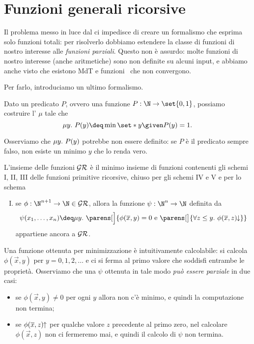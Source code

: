 \section{Funzioni generali ricorsive}

Il problema messo in luce dal  ci impedisce di creare un formalismo che esprima solo funzioni totali: per risolverlo dobbiamo estendere la classe di funzioni di nostro interesse alle \emph{funzioni parziali}. 
Questo non è assurdo: molte funzioni di nostro interesse (anche aritmetiche) sono non definite su alcuni input, e abbiamo anche visto che esistono MdT e funzioni \WHILE\ che non convergono.

Per farlo, introduciamo un ultimo formalismo.

\begin{definition}
    Dato un predicato $P$, ovvero una funzione $P : \N \to \set{0, 1}$, possiamo costruire l' $\mu$ tale che \[
        \mi{y}{P(y)} \deq \min \set*{y \given P(y) = 1}.
    \]
\end{definition}

Osserviamo che $\mu{y}.\ {P(y)}$ potrebbe non essere definito: se $P$ è il predicato sempre falso, non esiste un minimo $y$ che lo renda vero.

\begin{definition}
    L'insieme delle funzioni  $\mathcal{GR}$ è il minimo insieme di funzioni contenenti gli schemi I, II, III delle funzioni primitive ricorsive, chiuso per gli schemi IV e V e per lo schema \begin{enumerate}[I., start=6]
        \item {} se $\phi : \N^{n+1} \to \N \in \Rec$, allora la funzione $\psi : \N^n \to \N$ definita da \[
            \psi(x_1, \dots, x_n) \deq \mi{y}{\parens[\Big]{\phi(\vec x, y) = 0 \text{ e } \parens[\big]{\forall z \leq y.\ \phi(\vec x, z)\conv}}}
        \] appartiene ancora a $\mathcal{GR}$. 
    \end{enumerate} 
\end{definition}

Una funzione ottenuta per minimizzazione è intuitivamente calcolabile: si calcola $\phi(\vec x, y)$ per $y = 0, 1, 2, \dots$ e ci si ferma al primo valore che soddisfi entrambe le proprietà. Osserviamo che una $\psi$ ottenuta in tale modo \emph{può essere parziale} in due casi: \begin{itemize}
    \item se $\phi(\vec x, y) \neq 0$ per ogni $y$ allora non c'è minimo, e quindi la computazione non termina;
    \item se $\phi(\overline{x}, z)\!\!\uparrow$ per qualche valore $z$ precedente al primo zero, nel calcolare $\phi(\vec x, z)$ non ci fermeremo mai, e quindi il calcolo di $\psi$ non termina.  
\end{itemize}

